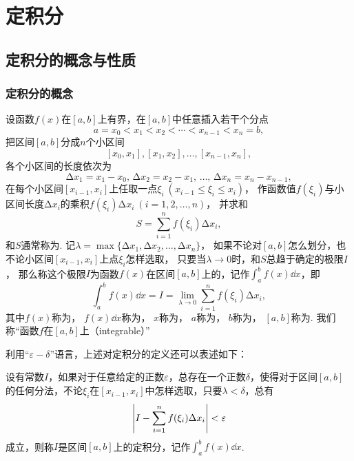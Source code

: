 \chapter{定积分}
\section{定积分的概念与性质}
\subsection{定积分的概念}
\begin{definition}
设函数\(f(x)\)在\([a,b]\)上有界，在\([a,b]\)中任意插入若干个分点\[
a=x_0 < x_1 < x_2 < \dotsb < x_{n-1} < x_n = b,
\]把区间\([a,b]\)分成\(n\)个小区间\[
[x_0,x_1],[x_1,x_2],\dotsc,[x_{n-1},x_n],
\]各个小区间的长度依次为\[
\increment x_1=x_1-x_0,\,\increment x_2=x_2-x_1,\,\dotsc,\,\increment x_n=x_n-x_{n-1},
\]
在每个小区间\([x_{i-1},x_i]\)上任取一点\(\xi_i\ (x_{i-1} \leq \xi_i \leq x_i)\)，
作函数值\(f(\xi_i)\)与小区间长度\(\increment x_i\)的乘积\(f(\xi_i)\increment x_i\ (i=1,2,\dotsc,n)\)，
并求和\[
S = \sum\limits_{i=1}^n f(\xi_i) \increment x_i,
\]
和\(S\)通常称为.
记\(\lambda=\max\{\increment x_1,\increment x_2,\dotsc,\increment x_n\}\)，
如果不论对\([a,b]\)怎么划分，也不论小区间\([x_{i-1},x_i]\)上点\(\xi_i\)怎样选取，
只要当\(\lambda\to0\)时，和\(S\)总趋于确定的极限\(I\)，
那么称这个极限\(I\)为函数\(f(x)\)在区间\([a,b]\)上的，记作\(\int_a^b f(x) \dd{x}\)，即
\begin{equation}
\int_a^b f(x) \dd{x}
= I
= \lim\limits_{\lambda\to0} \sum\limits_{i=1}^n f(\xi_i)\increment x_i,
\end{equation}
其中\(f(x)\)称为，
\(f(x)\dd{x}\)称为，
\(x\)称为，
\(a\)称为，
\(b\)称为，
\([a,b]\)称为.
我们称“函数\(f\)在\([a,b]\)上（integrable）”
\end{definition}

利用“\(\varepsilon-\delta\)”语言，上述对定积分的定义还可以表述如下：

设有常数\(I\)，如果对于任意给定的正数\(\varepsilon\)，总存在一个正数\(\delta\)，使得对于区间\([a,b]\)的任何分法，不论\(\xi_i\)在\([x_{i-1},x_i]\)中怎样选取，只要\(\lambda<\delta\)，总有\[
\abs{I - \sum\limits_{i=1}^n f(\xi_i) \Delta x_i}<\varepsilon
\]成立，则称\(I\)是区间\([a,b]\)上的定积分，记作\(\int_a^b f(x) \dd{x}\).

